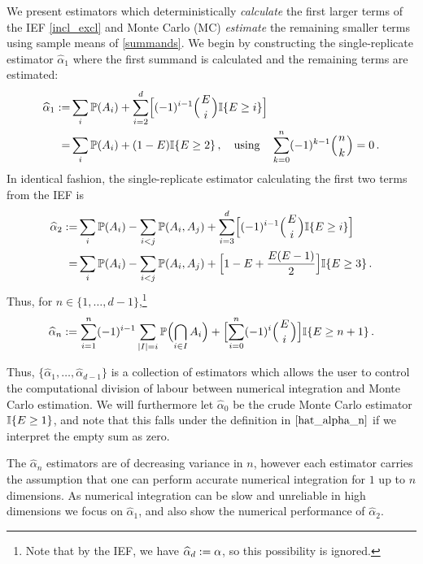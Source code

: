 We present estimators which deterministically \emph{calculate} the first larger terms of the IEF \eqref{incl_excl} and Monte Carlo (MC) \emph{estimate} the remaining smaller terms using sample means of \eqref{summands}.
We begin by constructing the single-replicate estimator $\hat{\alpha}_1$
where the first summand is calculated and the remaining terms are estimated:
\begin{align} \label{eq:alpha_1_hat}
	\hat{\alpha}_1 \defeq& \sum_i \Prob(A_i)  + \sum_{i=2}^d \Bigl[ (-1)^{i-1} \BigBinom{E}{i} \ind{E \ge i} \Bigr] \notag \\
	=& \sum_i \Prob(A_i)
+ (1 - E) \ind{E \ge 2 } \,, \quad \text{using} \quad \sum_{k=0}^n (-1)^{k-1} \BigBinom{n}{k} = 0 \,.
\end{align}
In identical fashion, the single-replicate estimator calculating the first two terms from the IEF is
\begin{align} \label{eq:alpha_2_hat}
	\hat{\alpha}_2
	\defeq& \sum_i \Prob(A_i) - \sum_{i<j}\Prob(A_i, A_j) + \sum_{i=3}^d \Bigl[ (-1)^{i-1} \BigBinom{E}{i} \ind{E \ge i} \Bigr] \notag \\
	=& \sum_i \Prob(A_i) - \sum_{i<j}\Prob(A_i, A_j) + \Bigl[1 - E + \frac{E (E-1)}{2} \Bigr] \ind{E \ge 3} \,.
\end{align}
Thus, for $n \in \{1,\dots,d-1\}$,\footnote{Note that by the IEF, we have
$\widehat{\alpha}_d:=\alpha$, so this possibility is ignored.}
\begin{equation} \label{hat_alpha_n}
	\hat{\alpha}_n \defeq
\sum_{i=1}^n (-1)^{i-1} \sum_{\card{I}=i} \Prob\Bigl( \bigcap_{i\in I} A_i \Bigr)
+ \Bigl[ \sum_{i=0}^n (-1)^{i} \BigBinom{E}{i} \Bigr] \ind{ E \ge n+1} \,.
\end{equation}

Thus, $\{\hat{\alpha}_1,\dots,\hat{\alpha}_{d-1}\}$ is a collection of estimators which allows the user to control the computational division of labour between numerical integration and Monte Carlo estimation. We will furthermore let
$\hat{\alpha}_0$ be the crude Monte Carlo estimator $\mathbb{I}\{ E \ge 1 \}$, and note that this falls under
the definition in $\eqref{hat_alpha_n}$ if we interpret the empty sum as zero.

The $\hat{\alpha}_n$ estimators are of decreasing variance in $n$, however each estimator carries the assumption that one can perform accurate numerical integration for $1$ up to $n$ dimensions.
As numerical integration can be slow and unreliable in high dimensions we focus on $\hat{\alpha}_1$, and also show the numerical performance of $\hat{\alpha}_2$.


